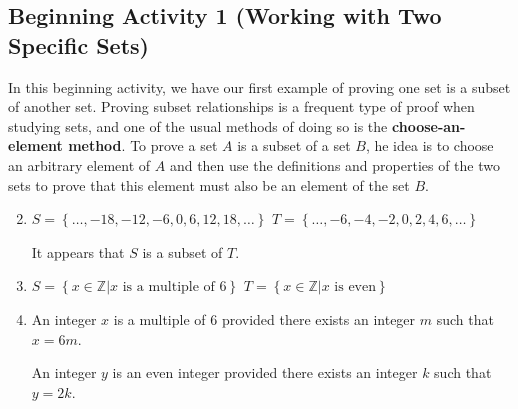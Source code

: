 \documentclass[11pt]{article}
\begin{document}


\subsection*{Beginning Activity 1 (Working with Two Specific Sets)}
In this beginning activity, we have our first example of proving one set is a subset of another set.  Proving subset relationships is a frequent type of proof when studying sets, and one of the usual methods of doing so is the \textbf{choose-an-element method}.  To prove a set $A$ is a subset of a set $B$, he idea is to choose an arbitrary element of $A$ and then use the definitions and properties of the two sets to prove that this element must also be an element of the set $B$.
\begin{enumerate} \setcounter{enumi}{1}
\item $S = \left\{ { \ldots ,  - 18,  - 12,  - 6, 0, 6, 12, 18,  \ldots } \right\}$ \quad
	$T = \left\{ { \ldots ,  - 6,  - 4,  - 2, 0, 2, 4, 6,  \ldots } \right\}$

It appears that  $S$  is a subset  of  $T$.

\item $S = \left\{ {x \in \mathbb{Z}\left. \right| x\text{ is a multiple of  6}} \right\}$ \quad
	$T = \left\{ {x \in \mathbb{Z}\left. \right| x\text{ is even}} \right\}$


\item An integer  $x$  is a multiple of  6  provided there exists an integer  $m$  such that  
$x = 6m$.

An integer  $y$  is an even integer provided there exists an integer  $k$  such that  
$y = 2k$.


\end{enumerate}
\end{document}
